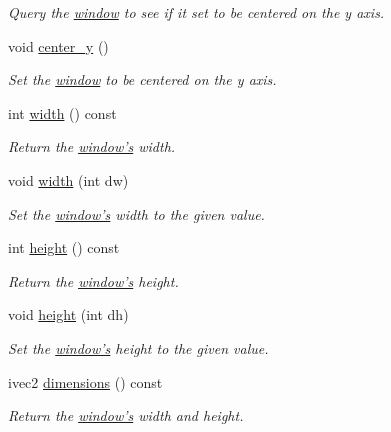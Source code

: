 \begin{DoxyCompactItemize}
\begin{DoxyCompactList}\small\item\em Query the \hyperlink{classgfx_1_1window}{window} to see if it set to be centered on the y axis. \end{DoxyCompactList}\item 
void \hyperlink{classgfx_1_1window_afef147064e76438ff276e2b6a7a08778}{center\-\_\-y} ()
\begin{DoxyCompactList}\small\item\em Set the \hyperlink{classgfx_1_1window}{window} to be centered on the y axis. \end{DoxyCompactList}\item 
int \hyperlink{classgfx_1_1window_a1e15545ad6e6a9b533bb0cf4fd473b65}{width} () const 
\begin{DoxyCompactList}\small\item\em Return the \hyperlink{classgfx_1_1window}{window's} width. \end{DoxyCompactList}\item 
void \hyperlink{classgfx_1_1window_a1f5b791b54d5a05c4873d86acf5f7ff1}{width} (int dw)
\begin{DoxyCompactList}\small\item\em Set the \hyperlink{classgfx_1_1window}{window's} width to the given value. \end{DoxyCompactList}\item 
int \hyperlink{classgfx_1_1window_a1bb84edf10b914b130c1c8665c1fc988}{height} () const 
\begin{DoxyCompactList}\small\item\em Return the \hyperlink{classgfx_1_1window}{window's} height. \end{DoxyCompactList}\item 
void \hyperlink{classgfx_1_1window_a0e4f80f47ad3943d6f330a87530fb3b5}{height} (int dh)
\begin{DoxyCompactList}\small\item\em Set the \hyperlink{classgfx_1_1window}{window's} height to the given value. \end{DoxyCompactList}\item 
ivec2 \hyperlink{classgfx_1_1window_a936065f7d801abf7c43c89f1a45f5ee5}{dimensions} () const 
\begin{DoxyCompactList}\small\item\em Return the \hyperlink{classgfx_1_1window}{window's} width and height. \end{DoxyCompactList}\item 

\end{DoxyCompactItemize}
